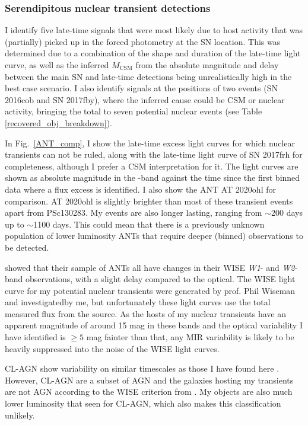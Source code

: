 \documentclass[a4paper,oneside,12pt, class=Latex/Classes/PhDthesisPSnPDF, crop=false]{standalone}
\begin{document}
\subsubsection{Serendipitous nuclear transient detections}
\label{sec:discussion:nuclear}
I identify five late-time signals that were most likely due to host activity that was (partially) picked up in the forced photometry at the SN location. This was determined due to a combination of the shape and duration of the late-time light curve, as well as the inferred $M_\text{CSM}$ from the absolute magnitude and delay between the main SN and late-time detections being unrealistically high in the best case scenario. I also identify signals at the positions of two events (SN 2016cob and SN 2017fby), where the inferred cause could be CSM or nuclear activity, bringing the total to seven potential nuclear events (see Table \ref{recovered_obj_breakdown}).

In Fig.~\ref{ANT_comp}, I show the late-time excess light curves for which nuclear transients can not be ruled, along with the late-time light curve of SN 2017frh for completeness, although I prefer a CSM interpretation for it. The light curves are shown as absolute magnitude in the \ztfr-band against the time since the first binned data where a flux excess is identified. I also show the ANT AT 2020ohl \citep{2020ohl_Hinkle} for comparison. AT 2020ohl is slightly brighter than most of these transient events apart from PSc130283. My events are also longer lasting, ranging from $\sim$200 days up to $\sim$1100 days. This could mean that there is a previously unknown population of lower luminosity ANTs that require deeper (binned) observations to be detected.

\citet{wiseman_ztfants} showed that their sample of ANTs all have changes in their WISE \textit{W1}- and \textit{W2}-band observations, with a slight delay compared to the optical. The WISE light curve for my potential nuclear transients were generated by prof. Phil Wiseman and investigatedby me, but unfortunately these light curves use the total measured flux from the source. As the hosts of my nuclear transients have an apparent magnitude of around 15 mag in these bands and the optical variability I have identified is $\geq5$ mag fainter than that, any MIR variability is likely to be heavily suppressed into the noise of the WISE light curves.

CL-AGN show variability on similar timescales as those I have found here \citep{CLAGN}. However, CL-AGN are a subset of AGN and the galaxies hosting my transients are not AGN according to the WISE criterion from \citet{WISE_crit}. My objects are also much lower luminosity that seen for CL-AGN, which also makes this classification unlikely.
\end{document}
